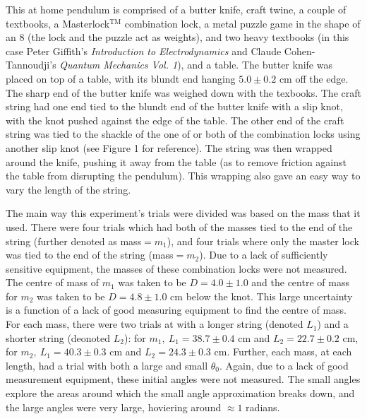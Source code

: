 \documentclass[11pt]{article}
\begin{document}
\begin{multicols}{2}

    This at home pendulum is comprised of a butter knife, craft twine, a couple of textbooks, a Masterlock$^\text{TM}$ combination lock, a metal puzzle game in the shape of an 8 (the lock and the puzzle act as weights), and two heavy textbooks (in this case Peter Giffith's \textit{Introduction to Electrodynamics} and Claude Cohen-Tannoudji's \textit{Quantum Mechanics Vol. 1}), and a table. The butter knife was placed on top of a table, with its blundt end hanging $5.0 \pm 0.2$ cm off the edge. The sharp end of the butter knife was weighed down with the texbooks. The craft string had one end tied to the blundt end of the butter knife with a slip knot, with the knot pushed against the edge of the table. The other end of the craft string was tied to the shackle of the one of or both of the combination locks using another slip knot (see Figure 1 for reference). The string was then wrapped around the knife, pushing it away from the table (as to remove friction against the table from disrupting the pendulum). This wrapping also gave an easy way to vary the length of the string.
    
    The main way this experiment's trials were divided was based on the mass that it used. There were four trials which had both of the masses tied to the end of the string (further denoted as mass$ = m_1$), and four trials where only the master lock was tied to the end of the string (mass$= m_2$). Due to a lack of sufficiently sensitive equipment, the masses of these combination locks were not measured. The centre of mass of $m_1$ was taken to be $D = 4.0 \pm 1.0$ and the centre of mass for $m_2$ was taken to be $D = 4.8 \pm 1.0$ cm below the knot. This large uncertainty is a function of a lack of good measuring equipment to find the centre of mass. For each mass, there were two trials at with a longer string (denoted $L_1$) and a shorter string (deonoted $L_2$): for $m_1, \ L_1 = 38.7 \pm 0.4$ cm and $L_2 = 22.7 \pm 0.2$ cm, for $m_2, \ L_1 = 40.3 \pm 0.3$ cm and $L_2 = 24.3 \pm 0.3$ cm. Further, each mass, at each length, had a trial with both a large and small $\theta_0$. Again, due to a lack of good measurement equipment, these initial angles were not measured. The small angles explore the areas around which the small angle approximation breaks down, and the large angles were very large, hoviering around $\approx 1$ radians.


\end{multicols}
\end{document}
